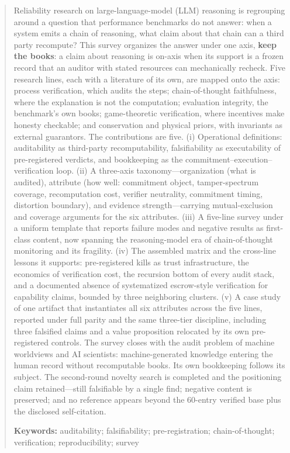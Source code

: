 \documentclass[11pt,a4paper]{article}
\begin{document}
\begin{abstract}


Reliability research on large-language-model (LLM) reasoning is regrouping around a question that performance benchmarks do not answer: when a system emits a chain of reasoning, what claim about that chain can a third party recompute? This survey organizes the answer under one axis, \textbf{keep the books}: a claim about reasoning is on-axis when its support is a frozen record that an auditor with stated resources can mechanically recheck. Five research lines, each with a literature of its own, are mapped onto the axis: process verification, which audits the steps; chain-of-thought faithfulness, where the explanation is not the computation; evaluation integrity, the benchmark's own books; game-theoretic verification, where incentives make honesty checkable; and conservation and physical priors, with invariants as external guarantors. The contributions are five. (i) Operational definitions: auditability as third-party recomputability, falsifiability as executability of pre-registered verdicts, and bookkeeping as the commitment–execution–verification loop. (ii) A three-axis taxonomy—organization (what is audited), attribute (how well: commitment object, tamper-spectrum coverage, recomputation cost, verifier neutrality, commitment timing, distortion boundary), and evidence strength—carrying mutual-exclusion and coverage arguments for the six attributes. (iii) A five-line survey under a uniform template that reports failure modes and negative results as first-class content, now spanning the reasoning-model era of chain-of-thought monitoring and its fragility. (iv) The assembled matrix and the cross-line lessons it supports: pre-registered kills as trust infrastructure, the economics of verification cost, the recursion bottom of every audit stack, and a documented absence of systematized escrow-style verification for capability claims, bounded by three neighboring clusters. (v) A case study of one artifact that instantiates all six attributes across the five lines, reported under full parity and the same three-tier discipline, including three falsified claims and a value proposition relocated by its own pre-registered controls. The survey closes with the audit problem of machine worldviews and AI scientists: machine-generated knowledge entering the human record without recomputable books. Its own bookkeeping follows its subject. The second-round novelty search is completed and the positioning claim retained—still falsifiable by a single find; negative content is preserved; and no reference appears beyond the 60-entry verified base plus the disclosed self-citation.

\noindent\textbf{Keywords:} auditability; falsifiability; pre-registration; chain-of-thought; verification; reproducibility; survey
\end{abstract}
\end{document}
